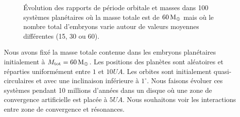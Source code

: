 \begin{figure}[htbp]
\centering
{}\hfill
{}

\hfill
{}

\caption{Évolution des rapports de période orbitale et masses dans 100 systèmes planétaires où la masse totale est de $60\mathrm{\thinspace M_\oplus}$ mais où le nombre total d'embryons varie autour de valeurs moyennes différentes (15, 30 ou 60). }\label{fig:number_effect}
\end{figure}

Nous avons fixé la masse totale contenue dans les embryons planétaires initialement à $M_\text{tot}=60\mathrm{\thinspace M_\oplus}$. Les positions des planètes sont aléatoires et réparties uniformément entre $1$ et $10\unit{UA}$. Les orbites sont initialement quasi-circulaires et avec une inclinaison inférieure à $1^\circ$. Nous faisons évoluer ces systèmes pendant 10 millions d'années dans un disque où une zone de convergence artificielle est placée à $5\unit{UA}$. Nous souhaitons voir les interactions entre zone de convergence et résonances. 

